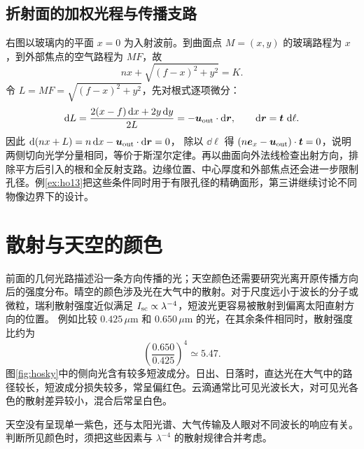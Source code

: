 \subsection{折射面的加权光程与传播支路}

右图以玻璃内的平面 $x=0$ 为入射波前。到曲面点 $M=(x,y)$ 的玻璃路程为 $x$，到外部焦点的空气路程为 $MF$，故
\[
nx+\sqrt{(f-x)^2+y^2}=K.
\]
令 $L=MF=\sqrt{(f-x)^2+y^2}$，先对根式逐项微分：
\[
 \mathop{}\!\mathrm d L=\frac{2(x-f)\mathop{}\!\mathrm d x+2y\mathop{}\!\mathrm d y}{2L}
      =-\bm u_{\rm out}\cdot\mathop{}\!\mathrm d\bm r,\qquad
 \mathop{}\!\mathrm d\bm r=\bm t\,\mathop{}\!\mathrm d\ell.
\]
因此 $\mathop{}\!\mathrm d(nx+L)=n\mathop{}\!\mathrm d x-\bm u_{\rm out}\cdot\mathop{}\!\mathrm d\bm r=0$，
除以 $\dd\ell$ 得 $(n\bm e_x-\bm u_{\rm out})\cdot\bm t=0$，说明两侧切向光学分量相同，等价于斯涅尔定律。再以曲面向外法线检查出射方向，排除平方后引入的根和全反射支路。边缘位置、中心厚度和外部焦点还会进一步限制孔径。例\ref{ex:ho13}把这些条件同时用于有限孔径的精确面形，第三讲继续讨论不同物像边界下的设计。

\section{散射与天空的颜色}

前面的几何光路描述沿一条方向传播的光；天空颜色还需要研究光离开原传播方向后的强度分布。晴空的颜色涉及光在大气中的散射。对于尺度远小于波长的分子或微粒，瑞利散射强度近似满足 $I_{\rm sc}\propto\lambda^{-4}$，短波光更容易被散射到偏离太阳直射方向的位置。
例如比较 $0.425\,\mu\mathrm m$ 和 $0.650\,\mu\mathrm m$ 的光，在其余条件相同时，散射强度比约为
\[
\left(\frac{0.650}{0.425}\right)^4\simeq5.47.
\]
图\ref{fig:hosky}中的侧向光含有较多短波成分。日出、日落时，直达光在大气中的路径较长，短波成分损失较多，常呈偏红色。云滴通常比可见光波长大，对可见光各色的散射差异较小，混合后常呈白色。

天空没有呈现单一紫色，还与太阳光谱、大气传输及人眼对不同波长的响应有关。判断所见颜色时，须把这些因素与 $\lambda^{-4}$ 的散射规律合并考虑。
